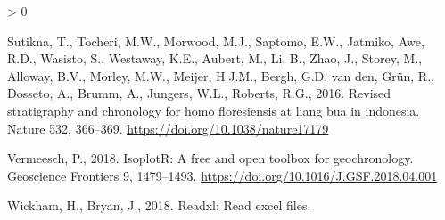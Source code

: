 \documentclass[]{elsarticle} %
\newlength{\cslhangindent}
\newenvironment{CSLReferences}[2] %
 {%
  \setlength{\parindent}{0pt}
  \ifodd #1 \everypar{\setlength{\hangindent}{\cslhangindent}}\ignorespaces\fi
  \ifnum #2 > 0
  \setlength{\parskip}{#2\baselineskip}
  \fi
 }%
 {}
\begin{document}
\begin{CSLReferences}{1}{0}
\leavevmode\hypertarget{ref-Sutikna2016}{}%
Sutikna, T., Tocheri, M.W., Morwood, M.J., Saptomo, E.W., Jatmiko, Awe, R.D., Wasisto, S., Westaway, K.E., Aubert, M., Li, B., Zhao, J., Storey, M., Alloway, B.V., Morley, M.W., Meijer, H.J.M., Bergh, G.D. van den, Grün, R., Dosseto, A., Brumm, A., Jungers, W.L., Roberts, R.G., 2016. Revised stratigraphy and chronology for homo floresiensis at liang bua in indonesia. Nature 532, 366--369. \url{https://doi.org/10.1038/nature17179}

\leavevmode\hypertarget{ref-vermeesch2018isoplotr}{}%
Vermeesch, P., 2018. IsoplotR: A free and open toolbox for geochronology. Geoscience Frontiers 9, 1479--1493. \url{https://doi.org/10.1016/J.GSF.2018.04.001}

\leavevmode\hypertarget{ref-Wickham_readxl}{}%
Wickham, H., Bryan, J., 2018. Readxl: Read excel files.

\end{CSLReferences}
\end{document}
